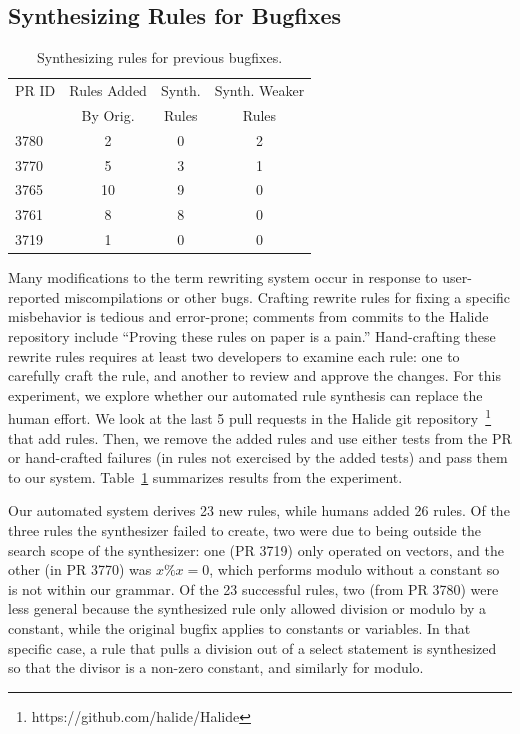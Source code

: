 \documentclass[sigplan,10pt,review,anonymous]{acmart}\settopmatter{printfolios=true,printccs=false,printacmref=false}
\begin{document}

\subsection{Synthesizing Rules for Bugfixes}
\begin{table}
  \caption{Synthesizing rules for previous bugfixes.}
  \label{tab:prbugfixes}
  \begin{tabular}{lccc}
    PR ID & Rules Added & Synth. & Synth. Weaker\\
          & By Orig.    & Rules  & Rules\\\hline
    3780 & 2 & 0 & 2\\
    3770 & 5 & 3 & 1\\
    3765 & 10 & 9 & 0\\
    3761 & 8 & 8 & 0\\
    3719 & 1 & 0 & 0\\
  \end{tabular}
\end{table}
Many modifications to the term rewriting system occur in response to user-reported
miscompilations or other bugs.  Crafting rewrite rules for fixing a specific misbehavior
is tedious and error-prone; comments from commits to the Halide repository include
``Proving these rules on paper is a pain.''  Hand-crafting these rewrite rules requires
at least two developers to examine each rule: one to carefully craft the rule, and another to
review and approve the changes.  For this experiment, we explore whether
our automated rule synthesis can replace the human effort.  We look at the last 5 pull
requests in the Halide git repository~\footnote{https://github.com/halide/Halide} that add rules.  Then, we remove
the added rules and use either tests from the PR or hand-crafted failures (in rules
not exercised by the added tests) and pass them to our system.
Table~\ref{tab:prbugfixes} summarizes results from the experiment.

Our automated system derives 23 new rules, while humans added 26 rules.  Of the three
rules the synthesizer failed to create, two were due to being outside the search scope
of the synthesizer: one (PR 3719) only operated on vectors, and the other (in PR 3770) was $x \% x = 0$, which
performs modulo without a constant so is not within our grammar.  Of the 23 successful
rules, two (from PR 3780) were less general because the synthesized rule only allowed division
or modulo by a constant, while the original bugfix applies to constants or variables.
In that specific case, a rule that pulls a division out of a select statement
is synthesized so that the divisor is a non-zero constant, and similarly for modulo.
\end{document}
